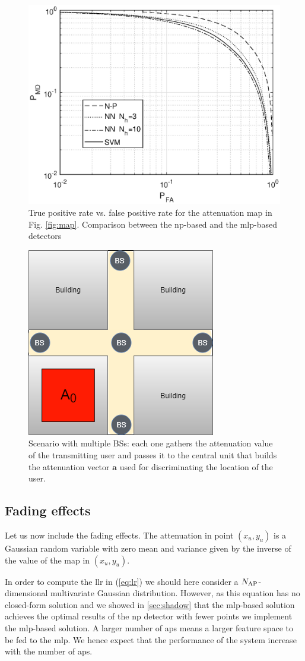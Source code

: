 \documentclass[draftcls,onecolumn,12pt]{IEEEtran}
\begin{document}
\begin{figure}
    \centering
    \includegraphics[width=0.5\columnwidth]{res_NP_approx_SVM.eps}
    \caption{True positive rate vs. false positive rate for the attenuation map in Fig. \ref{fig:map}. Comparison between the \ac{np}-based and the \ac{mlp}-based detectors}
    \label{fig:trueMap}
\end{figure}

\begin{figure}
    \centering
    \includegraphics[width=0.3\columnwidth]{scenario2.png}
    \caption{Scenario with multiple BSs: each one gathers the attenuation value of the transmitting user and passes it to the central unit that builds the attenuation vector $\bm{a}$ used for discriminating the location of the user.}
    \label{fig:mBS}
\end{figure}


\subsection{Fading effects}\label{sec:res_fading}
Let us now include the fading effects. The attenuation in point $(x_u,y_u)$ is a Gaussian random variable with zero mean and variance given by the inverse of the value of the map in $(x_u,y_u)$.


In order to compute the \ac{llr} in (\ref{eq:lr}) we should here consider a $N_{\rm AP}$-dimensional multivariate Gaussian distribution. However, as this equation has no closed-form solution and we showed in \ref{sec:shadow} that the \ac{mlp}-based solution achieves the optimal results of the \ac{np} detector with fewer points we implement the \ac{mlp}-based solution. A larger number of \acp{ap} means a larger feature space to be fed to the \ac{mlp}. We hence expect that the performance of the system increase with the number of \acp{ap}.
\end{document}
